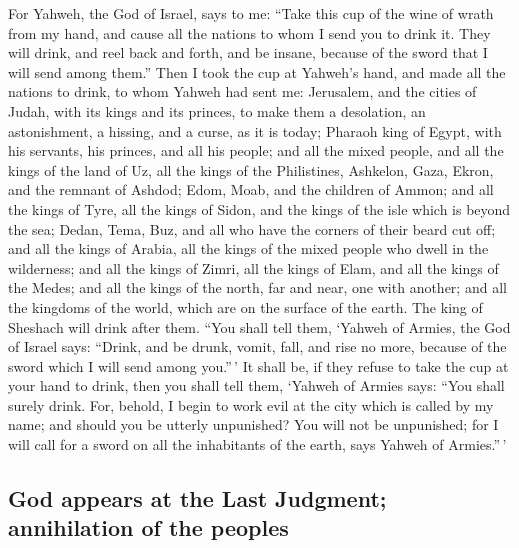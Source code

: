  For Yahweh, the God of Israel, says to me: ``Take this
cup of the wine of wrath from my hand, and cause all the nations to whom
I send you to drink it.  They will drink, and reel back
and forth, and be insane, because of the sword that I will send among
them.''  Then I took the cup at Yahweh's hand, and made
all the nations to drink, to whom Yahweh had sent me: 
Jerusalem, and the cities of Judah, with its kings and its princes, to
make them a desolation, an astonishment, a hissing, and a curse, as it
is today;  Pharaoh king of Egypt, with his servants, his
princes, and all his people;  and all the mixed people,
and all the kings of the land of Uz, all the kings of the Philistines,
Ashkelon, Gaza, Ekron, and the remnant of Ashdod;  Edom,
Moab, and the children of Ammon;  and all the kings of
Tyre, all the kings of Sidon, and the kings of the isle which is beyond
the sea;  Dedan, Tema, Buz, and all who have the corners
of their beard cut off;  and all the kings of Arabia, all
the kings of the mixed people who dwell in the wilderness;
 and all the kings of Zimri, all the kings of Elam, and
all the kings of the Medes;  and all the kings of the
north, far and near, one with another; and all the kingdoms of the
world, which are on the surface of the earth. The king of Sheshach will
drink after them.  ``You shall tell them, `Yahweh of
Armies, the God of Israel says: ``Drink, and be drunk, vomit, fall, and
rise no more, because of the sword which I will send among you.''\,'
 It shall be, if they refuse to take the cup at your hand
to drink, then you shall tell them, `Yahweh of Armies says: ``You shall
surely drink.  For, behold, I begin to work evil at the
city which is called by my name; and should you be utterly unpunished?
You will not be unpunished; for I will call for a sword on all the
inhabitants of the earth, says Yahweh of Armies.''\,'

\hypertarget{god-appears-at-the-last-judgment-annihilation-of-the-peoples}{%
\subsection{God appears at the Last Judgment; annihilation of the
peoples}\label{god-appears-at-the-last-judgment-annihilation-of-the-peoples}}

